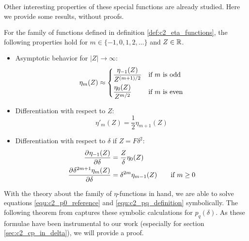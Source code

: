 Other interesting properties of these special functions are already studied. Here we provide some results, without proofs.
\begin{theorem}[Ixaru 1984]\label{the:c2_eta_functions}
    For the family of functions defined in definition \ref{def:c2_eta_functions}, the following properties hold for $m \in \{-1, 0, 1, 2, \dots\}$ and $Z \in \mathbb{R}$.
    \begin{itemize}
        \item Asymptotic behavior for $|Z| \to \infty$:
              $$\eta_m(Z) \approx  \begin{dcases}
                      \frac{\eta_{-1}(Z)}{Z^{(m+1)/2}} & \text{if $m$ is odd}  \\
                      \frac{\eta_{0}(Z)}{Z^{m/2}}      & \text{if $m$ is even}
                  \end{dcases}$$
        \item Differentiation with respect to $Z$:
              $$
                  \eta'_{m}(Z) = \frac{1}{2}\eta_{m+1}(Z)
              $$
        \item Differentiation with respect to $\delta$ if $Z = F\delta^2$:
              \begin{align*}
                  \pdv[]{\eta_{-1}(Z)}{\delta}             & = \frac{Z}{\delta} \eta_0(Z)                           \\
                  \pdv[]{\delta^{2m+1}\eta_{m}(Z)}{\delta} & = \delta^{2m} \eta_{m-1}(Z) \qquad \text{if } m \geq 0 \\
              \end{align*}
    \end{itemize}
\end{theorem}

With the theory about the family of $\eta$-functions in hand, we are able to solve equations \eqref{equ:c2_p0_reference} and \eqref{equ:c2_pq_definition} symbolically. The following theorem from \cite{ixaru_numerical_1984} captures these symbolic calculations for $p_q(\delta)$. As these formulae have been instrumental to our work (especially for section \ref{sec:c2_cp_in_delta}), we will provide a proof.

